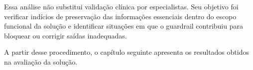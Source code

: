 Essa análise não substitui validação clínica por especialistas. Seu objetivo foi verificar indícios de preservação das informações essenciais dentro do escopo funcional da solução e identificar situações em que o guardrail contribuiu para bloquear ou corrigir saídas inadequadas.

A partir desse procedimento, o capítulo seguinte apresenta os resultados obtidos na avaliação da solução.